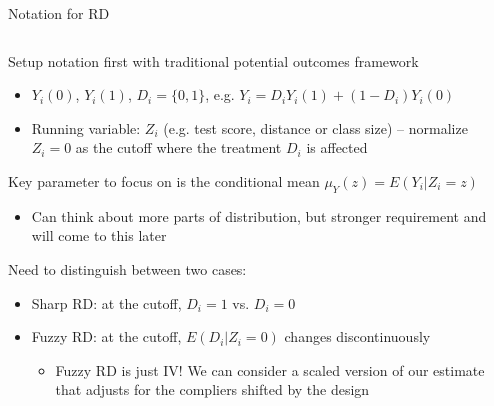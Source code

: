 \documentclass[notes,11pt, aspectratio=169]{beamer}
\newenvironment{wideitemize}{\itemize\addtolength{\itemsep}{10pt}}{\enditemize}
\begin{document}
\begin{frame}{Notation for RD}
  \begin{columns}[onlytextwidth, T] %
    \begin{column}{.8\textwidth}
      \begin{wideitemize}
      \item Setup notation first with traditional potential outcomes framework
        \begin{itemize}
        \item $Y_{i}(0)$, $Y_{i}(1)$, $D_{i} = \{0,1\}$, e.g. $Y_{i} = D_{i}Y_{i}(1) + (1-D_{i})Y_{i}(0)$
        \item Running variable: $Z_{i}$ (e.g. test score, distance or
          class size) -- normalize $Z_{i} = 0$ as the cutoff where the
          treatment $D_{i}$ is affected
      \end{itemize}
    \item Key parameter to focus on is the conditional mean $\mu_{Y}(z) = E(Y_{i} | Z_{i} = z)$
      \begin{itemize}
      \item Can think about more parts of distribution, but stronger requirement and will come to this later 
      \end{itemize}
    \item Need to distinguish between two cases:
      \begin{itemize}
      \item Sharp RD: at the cutoff, $D_{i} = 1$ vs. $D_{i} = 0$
      \item Fuzzy RD: at the cutoff, $E(D_{i}| Z_{i} = 0)$ changes
        discontinuously
        \begin{itemize}
        \item Fuzzy RD is just IV! We can consider a scaled version of
          our estimate that adjusts for the compliers shifted by the
          design
        \end{itemize}
      \end{itemize}
    \end{wideitemize}
  \end{column}%
  \hfill%
  \begin{column}{.4\textwidth}
    
  \end{column}%
\end{columns}
\end{frame}
\end{document}
